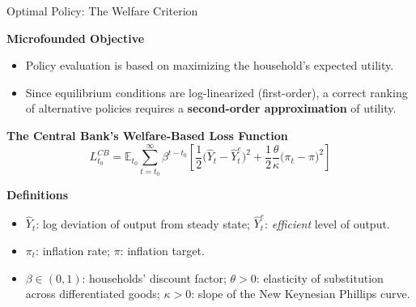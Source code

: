 \documentclass[11pt,aspectratio=169]{beamer}
\begin{document}
\begin{frame}[label=Loss Function]{Optimal Policy: The Welfare Criterion}
\small

\textbf{Microfounded Objective}
\begin{itemize}
  \item Policy evaluation is based on maximizing the household's expected utility.
  \item Since equilibrium conditions are log-linearized (first-order), a correct ranking of alternative policies requires a \textbf{second-order approximation} of utility.
\end{itemize}

\vspace{0.1cm}

\textbf{The Central Bank's Welfare-Based Loss Function}
\begin{equation}
L_{t_{0}}^{CB}
= \mathbb{E}_{t_{0}}\sum_{t=t_{0}}^{\infty}
\beta^{t-t_{0}}
\left[
\frac{1}{2}\big(\hat{Y}_{t}-\hat{Y}_{t}^{e}\big)^{2}
+ \frac{1}{2}\frac{\theta}{\kappa}\big(\pi_{t}-\pi\big)^{2}
\right]
\label{LossNK}
\end{equation}

\textbf{Definitions}
\begin{itemize}
  \item $\hat{Y}_{t}$: log deviation of output from steady state; $\hat{Y}_{t}^{e}$: \emph{efficient} level of output.
  \item $\pi_{t}$: inflation rate; $\pi$: inflation target.
  \item $\beta \in (0,1)$: households’ discount factor; $\theta>0$: elasticity of substitution across differentiated goods; $\kappa > 0$: slope of the New Keynesian Phillips curve.
\end{itemize}

\vspace{0.1cm}
\begin{center}
\hyperlink{Appendix F}{}
\end{center}

\end{frame}
\end{document}
